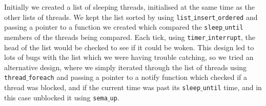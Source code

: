 \documentclass[a4paper,12pt]{article}
\begin{document}
Initially we created a list of sleeping threads, initialised at the same time as the other lists of threads. We kept the list sorted by using \texttt{list$\_$insert$\_$ordered} and passing a pointer to a function we created which compared the \texttt{sleep$\_$until} members of the threads being compared. Each tick, using \texttt{timer$\_$interrupt}, the head of the list would be checked to see if it could be woken. This design led to lots of bugs with the list which we were having trouble catching, so we tried an alternative design, where we simply iterated through the list of threads using \texttt{thread$\_$foreach} and passing a pointer to a notify function which checked if a thread was blocked, and if the current time was past its \texttt{sleep$\_$until} time, and in this case unblocked it using \texttt{sema$\_$up}.
\end{document}
